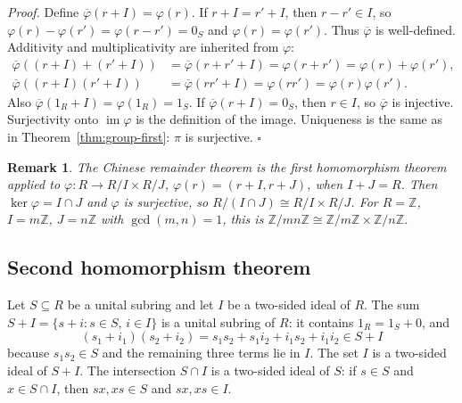 \documentclass[11pt,letterpaper]{article}
\newcommand{\Z}{\mathbb{Z}}
\newcommand{\Map}[3]{#1 \colon #2 \to #3}
\newtheorem{remark}[theorem]{Remark}
\newenvironment{proof}{\noindent\textit{Proof.}}{\hfill\(\square\)}
\begin{document}
\begin{proof}
Define \(\overline{\varphi}(r+I)=\varphi(r)\). If \(r+I=r'+I\), then \(r-r'\in I\), so \(\varphi(r)-\varphi(r')=\varphi(r-r')=0_S\) and \(\varphi(r)=\varphi(r')\). Thus \(\overline{\varphi}\) is well-defined. Additivity and multiplicativity are inherited from \(\varphi\):
\begin{align*}
\overline{\varphi}((r+I)+(r'+I))&=\overline{\varphi}(r+r'+I)=\varphi(r+r')=\varphi(r)+\varphi(r'),\\
\overline{\varphi}((r+I)(r'+I))&=\overline{\varphi}(rr'+I)=\varphi(rr')=\varphi(r)\varphi(r').
\end{align*}
Also \(\overline{\varphi}(1_R+I)=\varphi(1_R)=1_S\). If \(\overline{\varphi}(r+I)=0_S\), then \(r\in I\), so \(\overline{\varphi}\) is injective. Surjectivity onto \(\operatorname{im}\varphi\) is the definition of the image. Uniqueness is the same as in Theorem~\ref{thm:group-first}: \(\pi\) is surjective.
\end{proof}

\begin{center}
\end{center}

\begin{remark}
The Chinese remainder theorem is the first homomorphism theorem applied to \(\Map{\varphi}{R}{R/I\times R/J}\), \(\varphi(r)=(r+I,r+J)\), when \(I+J=R\). Then \(\ker\varphi=I\cap J\) and \(\varphi\) is surjective, so \(R/(I\cap J)\cong R/I\times R/J\). For \(R=\Z\), \(I=m\Z\), \(J=n\Z\) with \(\gcd(m,n)=1\), this is \(\Z/mn\Z\cong\Z/m\Z\times\Z/n\Z\).
\end{remark}

\subsection{Second homomorphism theorem}

Let \(S\subseteq R\) be a unital subring and let \(I\) be a two-sided ideal of \(R\). The sum \(S+I=\{s+i:s\in S,\, i\in I\}\) is a unital subring of \(R\): it contains \(1_R=1_S+0\), and
\[
(s_1+i_1)(s_2+i_2)=s_1 s_2 + s_1 i_2 + i_1 s_2 + i_1 i_2\in S+I
\]
because \(s_1 s_2\in S\) and the remaining three terms lie in \(I\). The set \(I\) is a two-sided ideal of \(S+I\). The intersection \(S\cap I\) is a two-sided ideal of \(S\): if \(s\in S\) and \(x\in S\cap I\), then \(sx,xs\in S\) and \(sx,xs\in I\).
\end{document}
